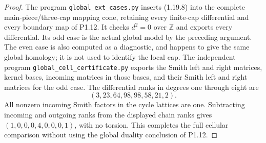 \begin{proof}
The program \texttt{global\_ext\_cases.py} inserts (1.19.8) into
the complete main-piece/three-cap mapping cone, retaining every
finite-cap differential and every boundary map of P1.12.
It checks $d^2=0$ over $\mathbb Z$ and exports every differential.
Its odd case is the actual global model by the preceding argument.
The even case is also computed as a diagnostic, and happens to give
the same global homology; it is not used to identify the local cap.
The independent program \texttt{global\_cell\_certificate.py}
exports the Smith left and right matrices, kernel bases, incoming
matrices in those bases, and their Smith left and right matrices
for the odd case.  The differential ranks in degrees one through
eight are
\[
                 (3,23,64,98,98,58,21,2).
\]
All nonzero incoming Smith factors in the cycle lattices are one.
Subtracting incoming and outgoing ranks from the displayed chain
ranks gives $(1,0,0,0,4,0,0,0,1)$, with no torsion.
This completes the full cellular comparison without using the
global duality conclusion of P1.12.
\end{proof}
